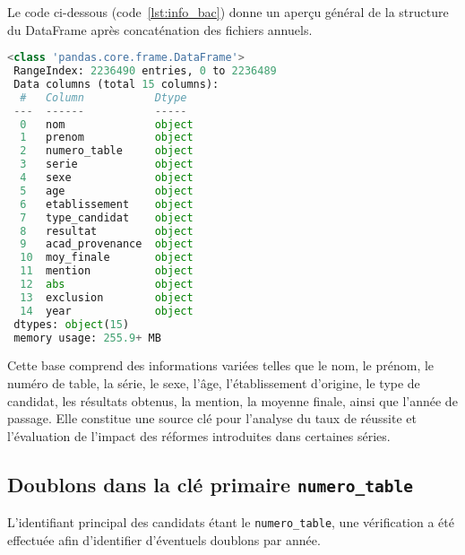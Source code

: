 Le code ci-dessous (code~\ref{lst:info_bac}) donne un aperçu général de la structure du DataFrame après concaténation des fichiers annuels.
\begin{lstlisting}[language=Python,
    caption=Informations général du DataFrame,
    label=lst:info_bac,
    basicstyle=\ttfamily\small,
    backgroundcolor=\color{gray!10}
]
 <class 'pandas.core.frame.DataFrame'>
 RangeIndex: 2236490 entries, 0 to 2236489
 Data columns (total 15 columns):
  #   Column           Dtype 
 ---  ------           ----- 
  0   nom              object
  1   prenom           object
  2   numero_table     object
  3   serie            object
  4   sexe             object
  5   age              object
  6   etablissement    object
  7   type_candidat    object
  8   resultat         object
  9   acad_provenance  object
  10  moy_finale       object
  11  mention          object
  12  abs              object
  13  exclusion        object
  14  year             object
 dtypes: object(15)
 memory usage: 255.9+ MB
\end{lstlisting}

Cette base comprend des informations variées telles que le nom, le prénom, le numéro de table, la série, le sexe, l’âge, l’établissement d’origine, le type de candidat, les résultats obtenus, la mention, la moyenne finale, ainsi que l’année de passage. 
Elle constitue une source clé pour l’analyse du taux de réussite et l’évaluation de l’impact des réformes introduites dans certaines séries.

\subsection{Doublons dans la clé primaire \texttt{numero\_table}}

L’identifiant principal des candidats étant le \texttt{numero\_table}, une vérification a été effectuée afin d’identifier d’éventuels doublons par année.

